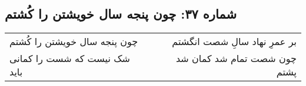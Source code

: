 \begin{center}
\section*{شماره ۳۷: چون پنجه سال خویشتن را کُشتم}
\label{sec:037}
\begin{longtable}{l p{0.5cm} r}
چون پنجه سال خویشتن را کُشتم
&&
بر عمرِ نهاد سالِ شصت انگشتم
\\
شک نیست که شست را کمانی باید
&&
چون شصت تمام شد کمان شد پشتم
\\
\end{longtable}
\end{center}
